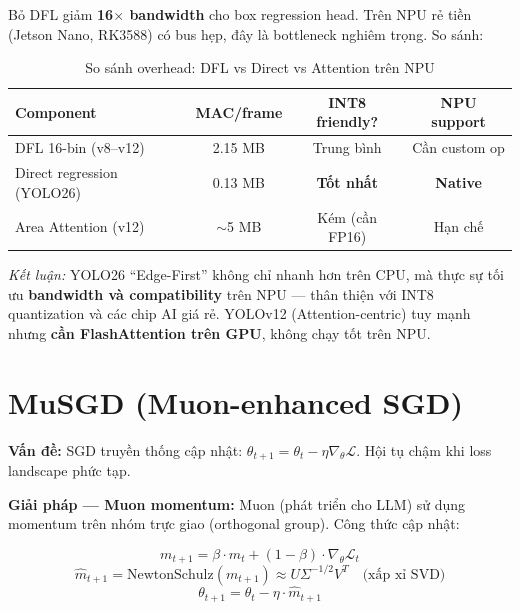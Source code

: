 Bỏ DFL giảm \textbf{16$\times$ bandwidth} cho box regression head. Trên NPU rẻ tiền (Jetson Nano, RK3588) có bus hẹp, đây là bottleneck nghiêm trọng. So sánh:

\begin{table}[H]\centering
\caption{So sánh overhead: DFL vs Direct vs Attention trên NPU}
\begin{tabular}{lccc}\toprule
\textbf{Component} & \textbf{MAC/frame} & \textbf{INT8 friendly?} & \textbf{NPU support}\\\midrule
DFL 16-bin (v8--v12) & 2.15 MB & Trung bình & Cần custom op \\
Direct regression (YOLO26) & 0.13 MB & \textbf{Tốt nhất} & \textbf{Native} \\
Area Attention (v12) & $\sim$5 MB & Kém (cần FP16) & Hạn chế \\\bottomrule
\end{tabular}
\end{table}

\textit{Kết luận:} YOLO26 ``Edge-First'' không chỉ nhanh hơn trên CPU, mà thực sự tối ưu \textbf{bandwidth và compatibility} trên NPU --- thân thiện với INT8 quantization và các chip AI giá rẻ. YOLOv12 (Attention-centric) tuy mạnh nhưng \textbf{cần FlashAttention trên GPU}, không chạy tốt trên NPU.

\section{MuSGD (Muon-enhanced SGD)}

\textbf{Vấn đề:} SGD truyền thống cập nhật: $\theta_{t+1} = \theta_t - \eta \nabla_\theta \mathcal{L}$. Hội tụ chậm khi loss landscape phức tạp.

\textbf{Giải pháp --- Muon momentum:} Muon (phát triển cho LLM) sử dụng momentum trên nhóm trực giao (orthogonal group). Công thức cập nhật:

\begin{equation}
m_{t+1} = \beta \cdot m_t + (1-\beta) \cdot \nabla_\theta \mathcal{L}_t
\end{equation}
\begin{equation}
\hat{m}_{t+1} = \mathrm{NewtonSchulz}(m_{t+1}) \approx U \Sigma^{-1/2} V^T \quad \text{(xấp xỉ SVD)}
\end{equation}
\begin{equation}
\theta_{t+1} = \theta_t - \eta \cdot \hat{m}_{t+1}
\end{equation}

